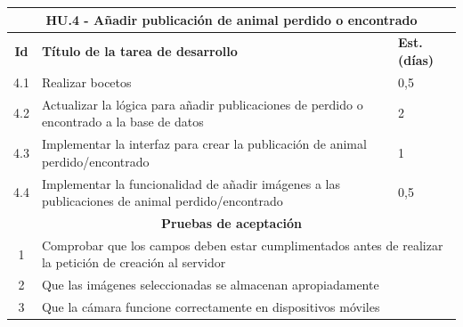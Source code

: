 \begin{table}[H]
	\centering
\begin{tabular}{|c|p{9.5cm}|p{1cm}|}
	\hline
	\multicolumn{3}{|c|}{\textbf{HU.4 - Añadir publicación de animal perdido o encontrado}} \\
	\hline
	\textbf{Id} & \textbf{Título de la tarea de desarrollo} & \textbf{Est. (días)} \\
	\hline
	4.1 & Realizar bocetos & 0,5 \\ \hline
	4.2 &  Actualizar la lógica para añadir publicaciones de perdido o encontrado a la base de datos & 2 \\ \hline
	4.3 &  Implementar la interfaz para crear la publicación de animal perdido/encontrado & 1 \\ \hline
	4.4 &  Implementar la funcionalidad de añadir imágenes a las publicaciones de animal perdido/encontrado & 0,5 \\ \hline
	\multicolumn{3}{|c|}{\textbf{Pruebas de aceptación}} \\ \hline
	1 & \multicolumn{2}{|p{10cm}|}{Comprobar que los campos deben estar cumplimentados antes de realizar la petición de creación al servidor} \\ \hline
	2 & \multicolumn{2}{|p{10cm}|}{Que las imágenes seleccionadas se almacenan apropiadamente} \\ \hline
	3 & \multicolumn{2}{|p{10cm}|}{Que la cámara funcione correctamente en dispositivos móviles} \\ \hline
\end{tabular}
\end{table}

